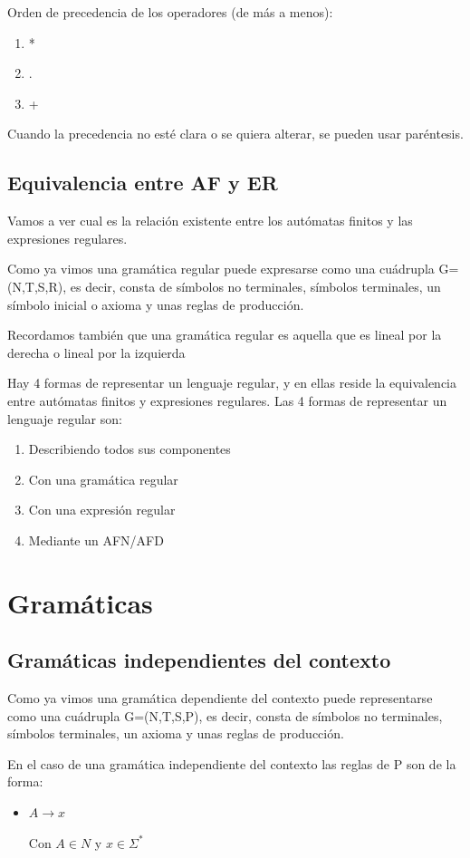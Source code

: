 \documentclass{apuntes}
\begin{document}
\newpage
Orden de precedencia de los operadores (de más a menos):
\begin{enumerate}
\item *
\item .
\item +
\end{enumerate}
Cuando la precedencia no esté clara o se quiera alterar, se pueden usar paréntesis.


\section{Equivalencia entre AF y ER}
Vamos a ver cual es la relación existente entre los autómatas finitos y las expresiones regulares.

Como ya vimos una gramática regular puede expresarse como una cuádrupla G=(N,T,S,R), es decir, consta de símbolos no terminales, símbolos terminales, un símbolo inicial o axioma y unas reglas de producción.

Recordamos también que una gramática regular es aquella que es lineal por la derecha o lineal por la izquierda
 
Hay 4 formas de representar un lenguaje regular, y en ellas reside la equivalencia entre autómatas finitos y expresiones regulares. Las 4 formas de representar un lenguaje regular son:
\begin{enumerate}
\item Describiendo todos sus componentes
\item Con una gramática regular
\item Con una expresión regular
\item Mediante un AFN/AFD
\end{enumerate}

\chapter{Gramáticas}
\section{Gramáticas independientes del contexto}
Como ya vimos una gramática dependiente del contexto puede representarse como una cuádrupla G=(N,T,S,P), es decir, consta de símbolos no terminales, símbolos terminales, un axioma y unas reglas de producción.

En el caso de una gramática independiente del contexto las reglas de P son de la forma:
\begin{itemize}
\item $A \rightarrow x$

Con $A\in N$ y $x \in \Sigma^*$
\end{itemize}
\end{document}
